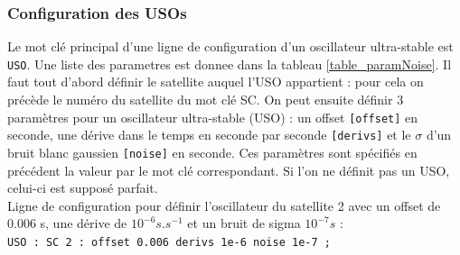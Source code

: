 \documentclass[a4paper,english,12pt]{article}
\begin{document}
\subsubsection{Configuration des USOs}
\label{SSSConfigUSO}
Le mot cl\'e principal d'une ligne de configuration d'un oscillateur ultra-stable est \texttt{USO}. Une liste des parametres est donnee dans la tableau \ref{table_paramNoise}. Il faut tout d'abord d\'efinir le satellite auquel l'USO appartient : pour cela on pr\'ec\`ede le num\'ero du satellite du mot cl\'e SC. On peut ensuite d\'efinir 3 param\`etres pour un oscillateur ultra-stable (USO) :  un offset \texttt{[offset]} en seconde, une d\'erive dans le temps en seconde par seconde \texttt{[derivs]} et le $\sigma$ d'un bruit blanc gaussien \texttt{[noise]} en seconde. Ces param\`etres sont sp\'ecifi\'es en pr\'ec\'edent la valeur par le mot cl\'e correspondant. Si l'on ne d\'efinit pas un USO, celui-ci est suppos\'e parfait. \\
Ligne de configuration pour d\'efinir l'oscillateur du satellite 2 avec un offset de 0.006 s, une d\'erive de  $10^{-6} s.s^{-1}$ et un bruit de sigma $10^{-7} s$ : \\
\hphantom{aaaaa}\texttt{USO : SC 2 : offset 0.006 derivs 1e-6 noise 1e-7 ;} \\ \\


\end{document}
